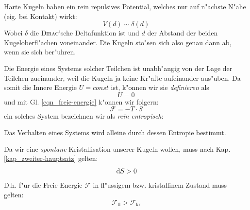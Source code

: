 Harte Kugeln haben ein rein repulsives Potential, welches nur auf
n"achste N"ahe (eig. bei Kontakt)  wirkt:
\begin{equation}
   \label{eqn_potential_hate_kugeln}
   V(d) \sim \delta(d)
\end{equation}
Wobei $\delta$ die \textsc{Dirac}'sche Deltafunktion ist und $d$ der
Abstand der beiden Kugeloberfl"achen voneinander. Die Kugeln sto"sen
sich also genau dann ab, wenn sie sich ber"uhren.

Die Energie eines Systems solcher Teilchen ist unabh"angig von der Lage
der Teilchen zueinander, weil die Kugeln ja keine Kr"afte aufeinander
aus"uben. Da somit die Innere Energie $U = const$ ist, k"onnen wir sie
\emph{definieren} als 
$$
 U = 0
$$
und mit Gl. \eqref{eqn_freie-energie} k"onnen wir folgern:
\begin{equation}
   \label{eqn_differenz-c3}
   \mathcal F = - T \cdot S
\end{equation}
ein solches System bezeichnen wir als \emph{rein entropisch}:
\begin{Def}
Das Verhalten eines Systems wird alleine durch dessen Entropie bestimmt.
\end{Def}

Da wir eine \emph{spontane} Kristallisation unserer Kugeln wollen,
muss nach Kap. \ref{kap_zweiter-hauptsatz} gelten: 
$$
\, \mathrm{d} S > 0
$$
D.h. f"ur die Freie Energie $\mathcal F$ in fl"ussigem bzw. kristallinem
Zustand muss gelten:
$$
\mathcal F_\text{fl} > \mathcal F_\text{kr}
$$

